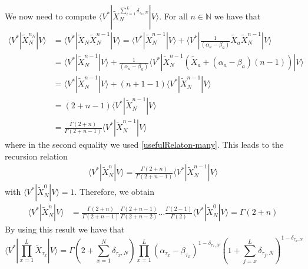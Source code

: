 \documentclass[10pt]{article}
\numberwithin{equation}{section}
\numberwithin{equation}{subsection}
\begin{document}
We now need to compute $\langle V^{*}|\widetilde{X}_{N}^{\sum_{i=1}^{L}\delta_{\tau_{x},N}}|V\rangle$. For all $n\in \mathbb{N}$ we have that  
\begin{align*}
	\langle V^{*}|\widetilde{X}_{N}^{n_{N}}|V\rangle&=\langle V^{*}|\widetilde{X}_{N}\widetilde{X}_{N}^{n-1}|V\rangle=\langle V^{*}|\widetilde{X}_{N}^{n-1}|V\rangle +\langle V^{*}|\frac{1}{(\alpha_{a}-\beta_{a})}\widetilde{X}_{a}\widetilde{X}_{N}^{n-1}|V\rangle
	\\&=
	\langle V^{*}|\widetilde{X}_{N}^{n-1}|V\rangle+\frac{1}{(\alpha_{a}-\beta_{a})}\langle V^{*}|\widetilde{X}_{N}^{n-1}\left(\widetilde{X}_{a}+(\alpha_{a}-\beta_{a})(n-1)\right)|V\rangle
	\\&=
	\langle V^{*}|\widetilde{X}_{N}^{n-1}|V\rangle+\left(n+1-1\right)\langle V^{*}|\widetilde{X}_{N}^{n-1}|V\rangle
	\\&=
	\left(2+n-1\right)\langle V^{*}|\widetilde{X}_{N}^{n-1}|V\rangle
	\\&=
	\frac{\Gamma(2+n)}{\Gamma(2+n-1)}\langle V^{*}|\widetilde{X}_{N}^{n-1}|V\rangle
\end{align*}
where in the second equality we used \eqref{usefulRelaton-many}. 
This leads to the recursion relation
\begin{align}
		\langle V^{*}|\widetilde{X}_{N}^{n}|V\rangle=\frac{\Gamma(2+n)}{\Gamma(2+n-1)}\langle V^{*}|\widetilde{X}_{N}^{n-1}|V\rangle
\end{align}
with $	\langle V^{*}|\widetilde{X}_{N}^{0}|V\rangle=1$. 
Therefore, we obtain 
\begin{align*}
	\langle V^{*}|\widetilde{X}_{N}^{n}|V\rangle&=%
	\frac{\Gamma(2+n)}{\Gamma(2+n-1)}\frac{\Gamma(2+n-1)}{\Gamma(2+n-2)}\ldots \frac{\Gamma(2-1)}{\Gamma(2)}\langle V^{*}|\widetilde{X}_{N}^{0}|V\rangle=
	\Gamma(2+n)
\end{align*}
By using this result we have that
\begin{equation}
	\langle V^{*}|\prod_{x=1}^{L}\widetilde{X}_{\tau_{x}}
	|V \rangle=\Gamma(2+\sum_{x=1}^{N}\delta_{\tau_{x},N})\prod_{x=1}^{L}\left(\alpha_{\tau_{x}}-\beta_{\tau_{x}}\right)^{1-\delta_{\tau_{x},N}}\left(1+\sum_{j=x}^{L}\delta_{\tau_{j},N}\right)^{1-\delta_{\tau_{x},N}}
\end{equation}
\end{document}
